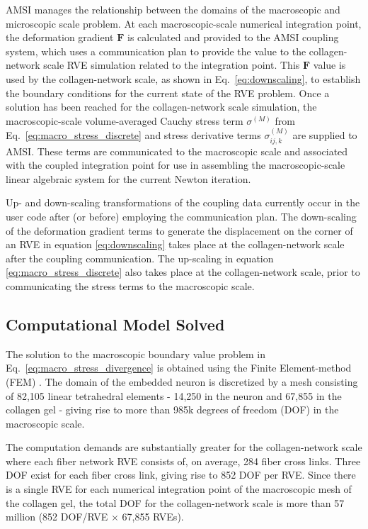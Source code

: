 \documentclass[]{interact}
\begin{document}
AMSI manages the relationship between the domains of the macroscopic and microscopic scale problem. At each macroscopic-scale numerical integration point, the deformation gradient $\pmb{F}$ is calculated and provided to the AMSI coupling system, which uses a communication plan to provide the value to the collagen-network scale RVE simulation related to the integration point. This $\pmb{F}$ value is used by the collagen-network scale, as shown in Eq.\ \eqref{eq:downscaling}, to establish the boundary conditions for the current state of the RVE problem. Once a solution has been reached for the collagen-network scale simulation, the macroscopic-scale volume-averaged Cauchy stress term $\sigma^{(M)}$ from Eq.\ \eqref{eq:macro_stress_discrete} and stress derivative terms $\sigma^{(M)}_{ij,k}$ are supplied to AMSI. These terms are communicated to the macroscopic scale and associated with the coupled integration point for use in assembling the macroscopic-scale linear algebraic system for the current Newton iteration.

Up- and down-scaling transformations of the coupling data currently occur in the user code after (or before) employing the communication plan. The down-scaling of the deformation gradient terms to generate the displacement on the corner of an RVE in equation \ref{eq:downscaling} takes place at the collagen-network scale after the coupling communication. The up-scaling in equation \ref{eq:macro_stress_discrete} also takes place at the collagen-network scale, prior to communicating the stress terms to the macroscopic scale.

\subsection{Computational Model Solved}\label{sec:specification}
The solution to the macroscopic boundary value problem in Eq.\ \eqref{eq:macro_stress_divergence} is obtained using the Finite Element-method (FEM) \citep{JavierBonet:2008uxa}. The domain of the embedded neuron is discretized by a mesh consisting of  82,105 linear tetrahedral elements - 14,250 in the neuron and 67,855 in the collagen gel - giving rise to more than 985k degrees of freedom (DOF) in the macroscopic scale.

The computation demands are substantially greater for the collagen-network scale where each fiber network RVE consists of, on average, 284 fiber cross links. Three DOF exist for each fiber cross link, giving rise to 852 DOF per RVE. Since there is a single RVE for each numerical integration point of the macroscopic mesh of the collagen gel, the total DOF for the collagen-network scale is more than 57 million (852 DOF/RVE $\times$ 67,855 RVEs). 
\end{document}
